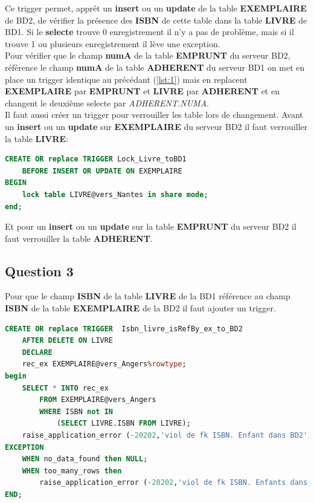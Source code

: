 \documentclass{article}
\begin{document}
Ce trigger permet, apprêt un \textbf{insert} ou un \textbf{update} de la table \textbf{EXEMPLAIRE} de BD2, de vérifier la présence des \textbf{ISBN} de cette table dans la table \textbf{LIVRE} de BD1. Si le \textbf{selecte} %
trouve 0 enregistrement il n'y a pas de problème, mais si il trouve 1 ou plusieurs enregistrement il lève une exception. 
\\

Pour vérifier que le champ \textbf{numA} de la table \textbf{EMPRUNT} du serveur BD2, référence le champ \textbf{numA} de la table \textbf{ADHERENT} du serveur BD1 on met en place un trigger identique au précédant (\ref{lst:1}) mais en replacent \textbf{EXEMPLAIRE} par \textbf{EMPRUNT} et \textbf{LIVRE} par \textbf{ADHERENT} et en changent le deuxième selecte par \textit{ADHERENT.NUMA}.
\\

Il faut aussi créer un trigger pour verrouiller les table lors de changement.
Avant un \textbf{insert} ou un \textbf{update} sur \textbf{EXEMPLAIRE} du serveur BD2 il faut verrouiller la table \textbf{LIVRE}:
\begin{lstlisting}[language=SQL, caption= Trigger: lock livre BD1]
CREATE OR replace TRIGGER Lock_Livre_toBD1
    BEFORE INSERT OR UPDATE ON EXEMPLAIRE
BEGIN
    lock table LIVRE@vers_Nantes in share mode;
end;
\end{lstlisting}
Et pour un \textbf{insert} ou un \textbf{update} sur la table \textbf{EMPRUNT} du serveur BD2 il faut verrouiller la table \textbf{ADHERENT}.


\subsection{Question 3}
Pour que le champ \textbf{ISBN} de la table \textbf{LIVRE} de la BD1 référence au champ \textbf{ISBN} de la table \textbf{EXEMPLAIRE} de la BD2 il faut ajouter un trigger.

\label{lst:2}
\begin{lstlisting}[language=SQL, caption= Trigger: ISBN livre ref exemplaire]
CREATE OR replace TRIGGER  Isbn_livre_isRefBy_ex_to_BD2
    AFTER DELETE ON LIVRE
    DECLARE
    rec_ex EXEMPLAIRE@vers_Angers%rowtype;
begin
    SELECT * INTO rec_ex 
        FROM EXEMPLAIRE@vers_Angers
        WHERE ISBN not IN
            (SELECT LIVRE.ISBN FROM LIVRE);
    raise_application_error (-20202,'viol de fk ISBN. Enfant dans BD2'); 
EXCEPTION
    WHEN no_data_found then NULL;
    WHEN too_many_rows then
        raise_application_error (-20202,'viol de fk ISBN. Enfants dans BD2');
END;
\end{lstlisting}
\end{document}
